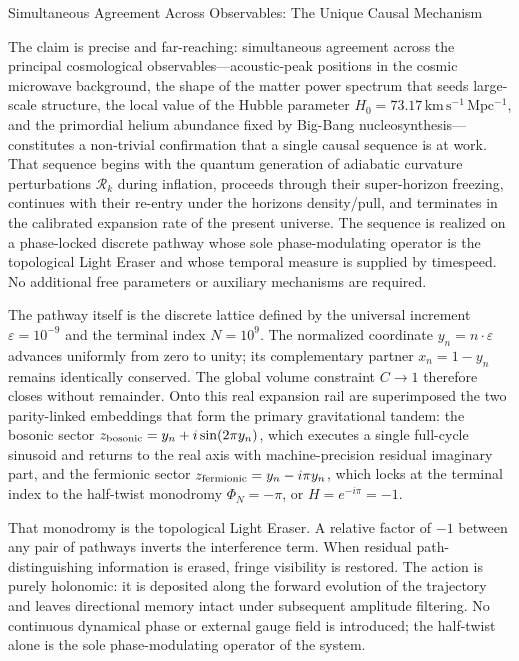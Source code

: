 Simultaneous Agreement Across Observables: The Unique Causal Mechanism

The claim is precise and far-reaching: simultaneous agreement across the principal cosmological observables—acoustic-peak positions in the cosmic microwave background, the shape of the matter power spectrum that seeds large-scale structure, the local value of the Hubble parameter \(H_0 = 73.17\,\mathrm{km\,s^{-1}\,Mpc^{-1}}\), and the primordial helium abundance fixed by Big-Bang nucleosynthesis—constitutes a non-trivial confirmation that a single causal sequence is at work. That sequence begins with the quantum generation of adiabatic curvature perturbations \(\mathcal{R}_k\) during inflation, proceeds through their super-horizon freezing, continues with their re-entry under the horizons density/pull, and terminates in the calibrated expansion rate of the present universe. The sequence is realized on a phase-locked discrete pathway whose sole phase-modulating operator is the topological Light Eraser and whose temporal measure is supplied by timespeed. No additional free parameters or auxiliary mechanisms are required.

The pathway itself is the discrete lattice defined by the universal increment \(\varepsilon = 10^{-9}\) and the terminal index \(N = 10^9\). The normalized coordinate \(y_n = n\cdot\varepsilon\) advances uniformly from zero to unity; its complementary partner \(x_n = 1 - y_n\) remains identically conserved. The global volume constraint \(C\to 1\) therefore closes without remainder. Onto this real expansion rail are superimposed the two parity-linked embeddings that form the primary gravitational tandem: the bosonic sector \(z_{\rm bosonic} = y_n + i\sin(2\pi y_n)\), which executes a single full-cycle sinusoid and returns to the real axis with machine-precision residual imaginary part, and the fermionic sector \(z_{\rm fermionic} = y_n - i\pi y_n\), which locks at the terminal index to the half-twist monodromy \(\Phi_N = -\pi\), or \(H = e^{-i\pi} = -1\).

That monodromy is the topological Light Eraser. A relative factor of \(-1\) between any pair of pathways inverts the interference term. When residual path-distinguishing information is erased, fringe visibility is restored. The action is purely holonomic: it is deposited along the forward evolution of the trajectory and leaves directional memory intact under subsequent amplitude filtering. No continuous dynamical phase or external gauge field is introduced; the half-twist alone is the sole phase-modulating operator of the system.

